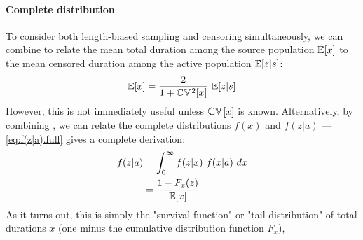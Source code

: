 \paragraph{Complete distribution}
To consider both length-biased sampling and censoring simultaneously,
we can combine  to relate
the mean total duration among the source population $\mathbb{E}[x]$ to
the mean censored duration among the active population $\mathbb{E}[z|s]$:
\begin{equation}
  \mathbb{E}[x] = \frac{2}{1 + \mathbb{CV}\hskip1pt^2[x]} ~ \mathbb{E}[z|s]
  \label{eq:E[x].cv}
\end{equation}
However, this is not immediately useful unless $\mathbb{CV}\hskip1pt[x]$ is known.
Alternatively, by combining , we can relate
the complete distributions $f(x)$ and $f(z|a)$
--- \eqref{eq:f(z|a).full} gives a complete derivation:\cite{Tufto2017}
\begin{equation}
  \begin{aligned}
    f(z|a) &= \int_0^\infty f(z|x) ~ f(x|a) ~ dx \\
           &= \frac{1 - F_x(z)}{\mathbb{E}[x]}
  \end{aligned}
  \label{eq:f(z|a)}
\end{equation}
As it turns out, this is simply
the "survival function" or "tail distribution" of total durations $x$
(one minus the cumulative distribution function $F_x$),
